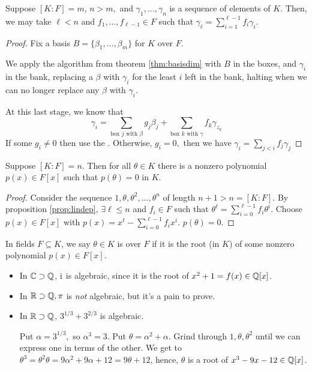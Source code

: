 \documentclass[notes.tex]{subfiles}
\begin{document}
\begin{proposition}
	\label{prop:lindep}
	Suppose $[K:F] = m$, $n>m,$ and $\gamma_1, \ldots, \gamma_n$ is a sequence of elements of $K$. Then, we may take $\ell < n$ and $f_1, \ldots, f_{\ell-1}\in F$ such that $\gamma_\ell = \sum_{i=1}^{\ell-1}f_i \gamma_i$.
\end{proposition}
\begin{proof}
	Fix a basis $B = \{\beta_1, \ldots, \beta_m\}$ for $K$ over $F$.

	We apply the algorithm from theorem \ref{thm:basisdim} with $B$ in the boxes, and $\gamma_i$ in the bank, replacing a $\beta$ with $\gamma_i$ for the least $i$ left in the bank, halting when we can no longer replace any $\beta$ with $\gamma_i$.

	At this last stage, we know that \[
	\gamma_i = \sum_{\text{box }j \text{ with }\beta}g_j \beta_j + \sum_{\text{box }k\text{ with }\gamma}f_k \gamma_{z_k}
	\]
	If some $g_i \ne 0$ then use the . Otherwise, $g_i=0,$ then we have $\gamma_i = \sum_{j<i}f_j \gamma_j$ 
\end{proof}

\begin{corollary}
	Suppose $[K:F]=n$. Then for all $\theta\in K$ there is a nonzero polynomial $p(x)\in F[x]$ such that $p(\theta) = 0$ in $K$.
\end{corollary}
\begin{proof}
	Consider the sequence $1, \theta, \theta^2, \ldots, \theta^n$ of length $n+1>n = [K:F]$. By proposition \ref{prop:lindep}, $\exists \ell\le n$ and $f_i\in F$ such that $\theta^\ell = \sum_{i=0}^{\ell-1}f_i\theta^i$. Choose $p(x)\in F[x]$ with $p(x) = x^\ell - \sum_{i=0}^{\ell-1}f_ix^i$.
	$p(\theta) = 0.$
\end{proof}

\begin{defn}
	In fields $F\subseteq K$, we say $\theta\in K$ is  over $F$ if it is the root (in $K$) of some nonzero polynomial $p(x)\in F[x]$.
\end{defn}

\begin{eg}\leavevmode
	\begin{itemize}
		\item In $\mathbb{C}\supset\mathbb{Q}$, $\mathrm{i}$ is algebraic, since it is the root of $x^2 +1 = f(x)\in \mathbb{Q}[x]$.
		\item In $\mathbb{R}\supset\mathbb{Q}, \pi$ is \emph{not} algebraic, but it's a pain to prove.
		\item In $\mathbb{R}\supset\mathbb{Q}$, $3^{1/3} +3^{2/3}$ is algebraic.

		Put $\alpha = 3^{1/3},$ so $\alpha^3 = 3$. Put $\theta = \alpha^2 + \alpha$. Grind through $1, \theta, \theta^2$ until we can express one in terms of the other. We get to $\theta^3 = \theta^2\theta = 9 \alpha^2 + 9 \alpha + 12 = 9 \theta + 12$, hence, $\theta$ is a root of $x^3-9x-12\in \mathbb{Q}[x]$.
	\end{itemize}
\end{eg}
\end{document}
